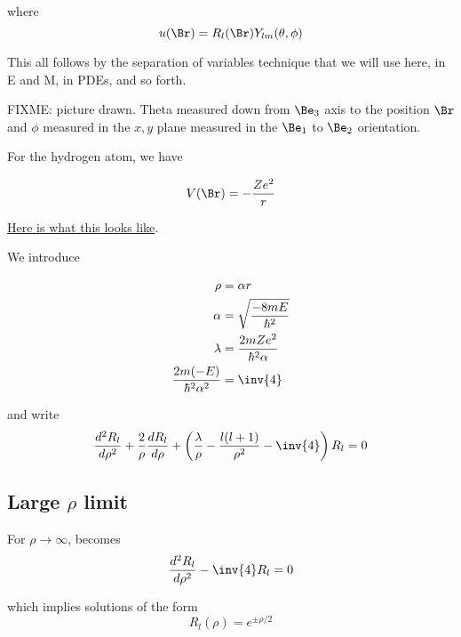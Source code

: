 where
\begin{equation}\label{eqn:PHY356FLecture10:80}
u(\Br) = R_l(\Br) Y_{lm}(\theta, \phi)
\end{equation}

This all follows by the separation of variables technique that we will use here, in E and M, in PDEs, and so forth.

FIXME: picture drawn.  Theta measured down from $\Be_3$ axis to the position $\Br$ and $\phi$ measured in the $x,y$ plane measured in the $\Be_1$ to $\Be_2$ orientation.

For the hydrogen atom, we have

\begin{equation}\label{eqn:PHY356FLecture10:90}
V(\Br) = - \frac{Z e^2}{r}
\end{equation}

\href{http://www.wolframalpha.com/input/?i=graph+-1/r}{Here is what this looks like}.

We introduce

\begin{align}\label{eqn:PHY356FLecture10:100}
\rho &= \alpha r \\
\alpha &= \sqrt{\frac{-8 m E}{\hbar^2}} \\
\lambda &= \frac{2 m Z e^2}{\hbar^2 \alpha} \\
\frac{2 m (- E) }{\hbar^2 \alpha^2 } &= \inv{4}
\end{align}

and write
\begin{equation}\label{eqn:PHY356FLecture10:110}
\frac{d^2 R_l}{d\rho^2} + \frac{2}{\rho} \frac{d R_l}{d\rho} + \left( \frac{\lambda}{\rho} - \frac{l(l+1)}{\rho^2} - \inv{4} \right) R_l = 0
\end{equation}

\subsection{Large \texorpdfstring{$\rho$}{rho} limit}

For $\rho \rightarrow \infty$,  becomes
\begin{equation}\label{eqn:PHY356FLecture10:120}
\frac{d^2 R_l}{d\rho^2} - \inv{4} R_l = 0
\end{equation}

which implies solutions of the form
\begin{equation}\label{eqn:PHY356FLecture10:130}
R_l(\rho) = e^{\pm \rho/2}
\end{equation}

